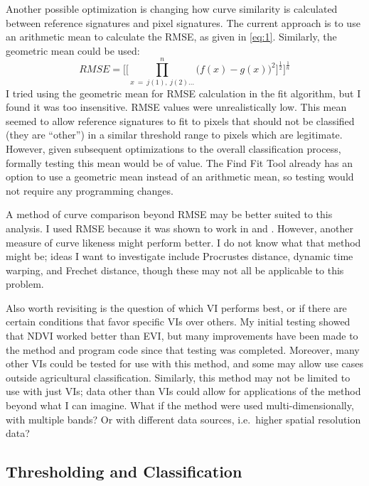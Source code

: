 Another possible optimization is changing how curve similarity is calculated between reference signatures and pixel signatures. The current approach is to use an arithmetic mean to calculate the RMSE, as given in \autoref{eq:1}. Similarly, the geometric mean could be used:
\begin{equation}
\label{eq:geometricmean}
  RMSE = \Biggl[\biggl[\prod_{x\ =\ j(1),\ j(2)\ldots}^{n}\bigl(f\left(x\right)-g\left(x\right)\bigr)^{2}\biggr]^{\frac{1}{2}}\Biggr]^{\frac{1}{n}}
\end{equation}
I tried using the geometric mean for RMSE calculation in the fit algorithm, but I found it was too insensitive. RMSE values were unrealistically low. This mean seemed to allow reference signatures to fit to pixels that should not be classified (they are ``other'') in a similar threshold range to pixels which are legitimate. However, given subsequent optimizations to the overall classification process, formally testing this mean would be of value. The Find Fit Tool already has an option to use a geometric mean instead of an arithmetic mean, so testing would not require any programming changes.

A method of curve comparison beyond RMSE may be better suited to this analysis. I used RMSE because it was shown to work in \textcite{brown2007multitemporal} and \textcite{sakamoto2010a-two-step}. However, another measure of curve likeness might perform better. I do not know what that method might be; ideas I want to investigate include Procrustes distance, dynamic time warping, and Frechet distance, though these may not all be applicable to this problem.

Also worth revisiting is the question of which VI performs best, or if there are certain conditions that favor specific VIs over others. My initial testing showed that NDVI worked better than EVI, but many improvements have been made to the method and program code since that testing was completed. Moreover, many other VIs could be tested for use with this method, and some may allow use cases outside agricultural classification. Similarly, this method may not be limited to use with just VIs; data other than VIs could allow for applications of the method beyond what I can imagine. What if the method were used multi-dimensionally, with multiple bands? Or with different data sources, i.e.\ higher spatial resolution data?

\subsection{Thresholding and Classification}

